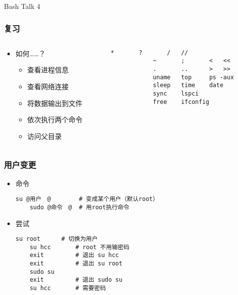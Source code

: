 



\PreFirstFrame
\begin{frame} [fragile]
	\centerline{\fontsize{42}{42}\selectfont Bash Talk 4}
\end{frame}
\PostFirstFrame

\begin{frame} [fragile]
	\frametitle{复习}
	\linespread{1.5}
	\begin{columns}[T]
		\begin{column}[T]{.5\textwidth}
			\begin{itemize}
			\item 如何……？
				\begin{itemize}
				\item 查看进程信息
				\item 查看网络连接
				\item 将数据输出到文件
				\item 依次执行两个命令
				\item 访问父目录
				\end{itemize}
			\end{itemize}
		\end{column}
		\begin{column}[T]{.5\textwidth}
			\begin{lstlisting}[style=bashstyle, gobble=12, texcl]
			*		?		/	//
			~		;		<	<<
			.		..		>	>>
			uname	top		ps -aux
			sleep	time	date
			sync	lspci
			free	ifconfig
			\end{lstlisting}
		\end{column}
	\end{columns}
\end{frame}

\begin{frame} [fragile]
	\frametitle{用户变更}
	\linespread{1.25}
	\begin{itemize}
	\item 命令
	\begin{lstlisting}[style=bashstyle, gobble=4, texcl, escapechar=@]
	su @用户　@		# 变成某个用户（默认root）
	sudo @命令　@	# 用root执行命令
	\end{lstlisting}
	\item 尝试
	\begin{lstlisting}[style=bashstyle, gobble=4, texcl]
	su root		 # 切换为用户
	su hcc		 # root 不用输密码
	exit		 # 退出 su hcc
	exit		 # 退出 su root
	sudo su
	exit		 # 退出 sudo su
	su hcc		 # 需要密码
	\end{lstlisting}
	\end{itemize}
\end{frame}

